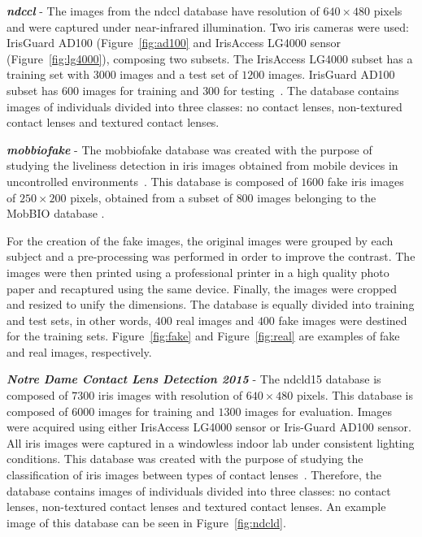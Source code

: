 \documentclass[conference]{IEEEtran}
\begin{document}
\textit{\textbf{\acrlong*{ndccl}}} - The images from the \gls*{ndccl} database have resolution of $640\times480$ pixels and were captured under near-infrared illumination. Two iris cameras were used: IrisGuard AD100 (Figure~\ref{fig:ad100} and IrisAccess LG4000 sensor (Figure~\ref{fig:lg4000}), composing two subsets. The IrisAccess LG4000 subset has a training set with $3000$ images and a test set of $1200$ images. IrisGuard AD100 subset has $600$ images for training and $300$ for testing~\cite{doyle2013variation, yadav2014unraveling}.
The database contains images of individuals divided into three classes: no contact lenses, non-textured contact lenses and textured contact lenses.

\textit{\textbf{\acrshort*{mobbiofake}}} - The \acrshort*{mobbiofake} database was created with the purpose of studying the liveliness detection in iris images obtained from mobile devices in uncontrolled environments~\cite{sequeira2014iris}. This database is composed of $1600$ fake iris images of $250\times200$ pixels, obtained from a subset of $800$ images belonging to the MobBIO database \cite{sequeira2014mobbio}. 

For the creation of the fake images, the original images were grouped by each subject and a pre-processing was performed in order to improve the contrast. The images were then printed using a professional printer in a high quality photo paper and recaptured using the same device. Finally, the images were cropped and resized to unify the dimensions. The database is equally divided into training and test sets, in other words, $400$ real images and $400$ fake images were destined for the training sets. Figure~\ref{fig:fake} and Figure~\ref{fig:real} are examples of fake and real images, respectively.

\textit{\textbf{Notre Dame Contact Lens Detection 2015}} - The \gls*{ndcld15} database is composed of $7300$ iris images with resolution of $640\times480$ pixels. 
This database is composed of $6000$ images for training and $1300$ images for evaluation. 
Images were acquired using either IrisAccess LG4000 sensor or Iris-Guard AD100 sensor.
All iris images were captured in a windowless indoor lab under consistent lighting conditions.
This database was created with the purpose of studying the classification of iris images between types of contact lenses~\cite{doyle2015robust}. 
Therefore, the database contains images of individuals divided into three classes: no contact lenses, non-textured contact lenses and textured contact lenses. 
An example image of this database can be seen in Figure~\ref{fig:ndcld}.
\end{document}
